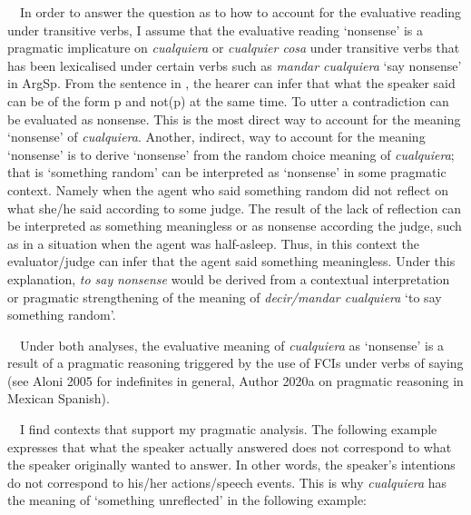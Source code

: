 \documentclass[10pt]{article}
\newenvironment{styleStandard}{\renewcommand\baselinestretch{1.25}\setlength\leftskip{0cm}\setlength\rightskip{0cm}\setlength\parindent{0cm}\setlength\parfillskip{0pt plus 1fil}\setlength\parskip{0in plus 1pt}\writerlistparindent\writerlistleftskip\leavevmode\normalfont\normalsize\fontsize{12pt}{14.4pt}\selectfont\writerlistlabel\ignorespaces}{\unskip\vspace{0in plus 1pt}\par}
\newcommand\writerlistleftskip{}
\newcommand\writerlistparindent{}
\newcommand\writerlistlabel{}
\begin{document}
\begin{styleStandard}
\ \ In order to answer the question as to how to account for the evaluative reading under transitive verbs, I assume that the evaluative reading ‘nonsense’ is a pragmatic implicature on \textit{cualquiera} or \textit{cualquier cosa} under transitive verbs that has been lexicalised under certain verbs such as \textit{mandar cualquiera} ‘say nonsense’ in ArgSp. From the sentence in , the hearer can infer that what the speaker said can be of the form p and not(p) at the same time. To utter a contradiction can be evaluated as nonsense. This is the most direct way to account for the meaning ‘nonsense’ of \textit{cualquiera}. Another, indirect, way to account for the meaning ‘nonsense’ is to derive ‘nonsense’ from the random choice meaning of \textit{cualquiera}; that is ‘something random’ can be interpreted as ‘nonsense’ in some pragmatic context. Namely when the agent who said something random did not reflect on what she/he said according to some judge. The result of the lack of reflection can be interpreted as something meaningless or as nonsense according the judge, such as in a situation when the agent was half-asleep. Thus, in this context the evaluator/judge can infer that the agent said something meaningless. Under this explanation, \textit{to say} \textit{nonsense} would be derived from a contextual interpretation or pragmatic strengthening of the meaning of \textit{decir/mandar cualquiera} ‘to say something random’. 
\end{styleStandard}

\begin{styleStandard}
\ \ Under both analyses, the evaluative meaning of \textit{cualquiera} as ‘nonsense’ is a result of a pragmatic reasoning triggered by the use of FCIs under verbs of saying (see Aloni 2005 for indefinites in general, Author 2020a on pragmatic reasoning in Mexican Spanish). 
\end{styleStandard}

\begin{styleStandard}
\ \ I find contexts that support my pragmatic analysis. The following example expresses that what the speaker actually answered does not correspond to what the speaker originally wanted to answer. In other words, the speaker’s intentions do not correspond to his/her actions/speech events. This is why \textit{cualquiera} has the meaning of ‘something unreflected’ in the following example:
\end{styleStandard}
\end{document}
